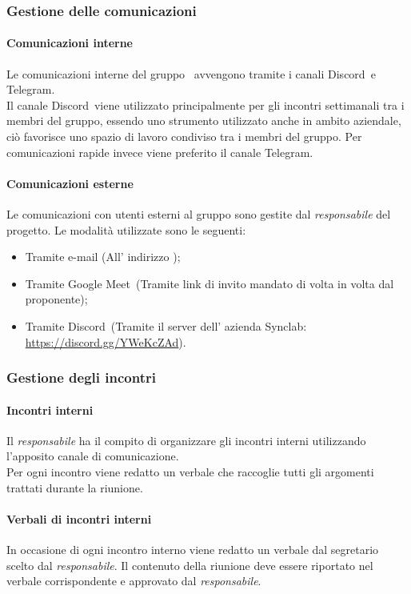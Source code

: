     \subsubsection{Gestione delle comunicazioni}
      \paragraph{Comunicazioni interne}
       Le comunicazioni interne del gruppo \groupName\ avvengono tramite i canali Discord\glo\ e Telegram\glo.\\
       Il canale Discord\glo\ viene utilizzato principalmente per gli incontri settimanali tra i membri del gruppo, essendo uno strumento utilizzato anche in ambito aziendale, ciò favorisce uno spazio di lavoro condiviso tra i membri del gruppo.
       Per comunicazioni rapide invece viene preferito il canale Telegram\glo.
      
      \paragraph{Comunicazioni esterne}
      Le comunicazioni con utenti esterni al gruppo sono gestite dal \textit{responsabile} del progetto. Le modalità utilizzate sono le seguenti:
      \begin {itemize}
        \item Tramite e-mail (All' indirizzo \groupEmail);
        \item Tramite Google Meet\glo\ (Tramite link di invito mandato di volta in volta dal proponente);
        \item Tramite Discord\glo\ (Tramite il server dell' azienda Synclab: \url{https://discord.gg/YWeKcZAd}).
      \end {itemize}

    \subsubsection{Gestione degli incontri}
      \paragraph{Incontri interni}
        Il \textit{responsabile} ha il compito di organizzare gli incontri interni utilizzando l'apposito canale di comunicazione.\\
        Per ogni incontro viene redatto un verbale che raccoglie tutti gli argomenti trattati durante la riunione.
      \paragraph {Verbali di incontri interni}
      In occasione di ogni incontro interno viene redatto un verbale dal segretario scelto dal \textit{responsabile}. Il contenuto della riunione deve essere riportato nel verbale corrispondente e approvato dal \textit{responsabile}.

